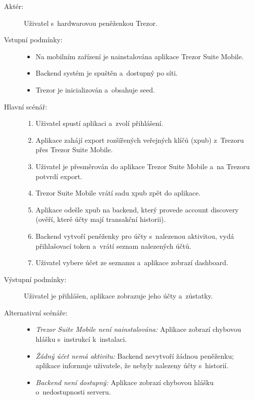 \begin{description}
  \item[Aktér:] Uživatel s~hardwarovou peněženkou Trezor.
  \item[Vstupní podmínky:] \hfill
    \begin{itemize}
      \item Na mobilním zařízení je nainstalována aplikace Trezor Suite Mobile.
      \item Backend systém je spuštěn a~dostupný po síti.
      \item Trezor je inicializován a~obsahuje seed.
    \end{itemize}
  \item[Hlavní scénář:] \hfill
    \begin{enumerate}
      \item Uživatel spustí aplikaci a~zvolí přihlášení.
      \item Aplikace zahájí export rozšířených veřejných klíčů (xpub)
            z~Trezoru přes Trezor Suite Mobile.
      \item Uživatel je přesměrován do aplikace Trezor Suite Mobile a~na
            Trezoru potvrdí export.
      \item Trezor Suite Mobile vrátí sadu xpub zpět do aplikace.
      \item Aplikace odešle xpub na backend, který provede account discovery
            (ověří, které účty mají transakční historii).
      \item Backend vytvoří peněženky pro účty s~nalezenou aktivitou, vydá
            přihlašovací token a~vrátí seznam nalezených účtů.
      \item Uživatel vybere účet ze seznamu a~aplikace zobrazí dashboard.
    \end{enumerate}
  \item[Výstupní podmínky:] Uživatel je přihlášen, aplikace zobrazuje jeho účty
    a~zůstatky.
  \item[Alternativní scénáře:] \hfill
    \begin{itemize}
      \item \emph{Trezor Suite Mobile není nainstalována:} Aplikace zobrazí chybovou
            hlášku s~instrukcí k~instalaci.
      \item \emph{Žádný účet nemá aktivitu:} Backend nevytvoří žádnou peněženku;
            aplikace informuje uživatele, že nebyly nalezeny účty s~historií.
      \item \emph{Backend není dostupný:} Aplikace zobrazí chybovou hlášku o~nedostupnosti
            serveru.
    \end{itemize}
\end{description}

